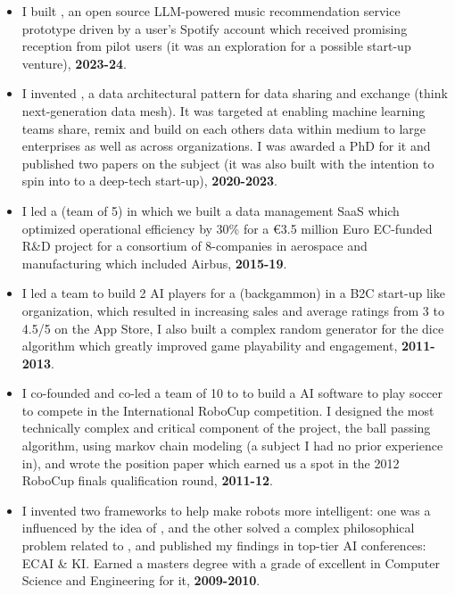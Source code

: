 \begin{itemize}

\item I built , an open source LLM-powered music recommendation service prototype driven by a user’s Spotify account which received promising reception from pilot users (it was an exploration for a possible start-up venture), \textbf{2023-24}.

\item I invented , a data architectural pattern for data sharing and exchange (think next-generation data mesh). It was targeted at enabling machine learning teams share, remix and build on each others data within medium to large enterprises as well as across organizations. I was awarded a PhD for it and published two papers on the subject (it was also built with the intention to spin into to a deep-tech start-up), \textbf{2020-2023}.

\item I led a  (team of 5) in which we built a data management SaaS which optimized operational efficiency by 30\% for a €3.5 million Euro EC-funded R\&D project for a consortium of 8-companies in aerospace and manufacturing which included Airbus, \textbf{2015-19}.

\item I led a team to build 2 AI players for a  (backgammon) in a B2C start-up like organization, which resulted in increasing sales and average ratings from 3 to 4.5/5 on the App Store, I also built a complex random generator for the dice algorithm which greatly improved game playability and engagement, \textbf{2011-2013}.

\item I co-founded and co-led a team of 10 to to build a AI software to play soccer to compete in the International RoboCup competition. I designed the most technically complex and critical component of the project, the ball passing algorithm, using markov chain modeling (a subject I had no prior experience in), and wrote the position paper which earned us a spot in the 2012 RoboCup finals qualification round, \textbf{2011-12}.

\item I invented two frameworks to help make robots more intelligent: one was a influenced by the idea of , and the other solved a complex philosophical problem related to , and published my findings in top-tier AI conferences: ECAI \& KI. Earned a masters degree with a grade of excellent in Computer Science and Engineering for it, \textbf{2009-2010}.


\end{itemize}
